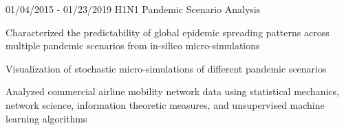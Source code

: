 \begin{cventries}
{\begin{cvitems}
      \end{cvitems}     
    }
  \cventry
  	{} %
    {} %
    {} %
    {01/04/2015 - 01/23/2019} %
    {H1N1 Pandemic Scenario Analysis}
    {
      \begin{cvitems} %
        \item {Characterized the predictability of global epidemic spreading patterns across multiple pandemic scenarios from in-silico micro-simulations}
        \item {Visualization of stochastic micro-simulations of different pandemic scenarios}
    \item {Analyzed commercial airline mobility network data using statistical mechanics, network science, information theoretic measures, and unsupervised machine learning algorithms}

\end{cvitems}}
\end{cventries}
